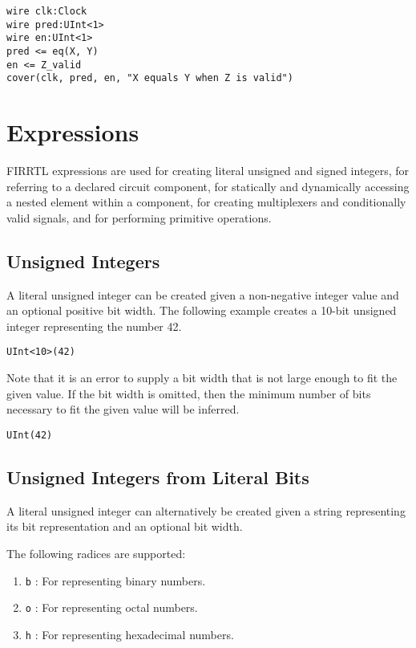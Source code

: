 \documentclass[12pt]{article}
\begin{document}
\begin{lstlisting}
wire clk:Clock
wire pred:UInt<1>
wire en:UInt<1>
pred <= eq(X, Y)
en <= Z_valid
cover(clk, pred, en, "X equals Y when Z is valid")
\end{lstlisting}

\section{Expressions}

FIRRTL expressions are used for creating literal unsigned and signed integers, for referring to a declared circuit component, for statically and dynamically accessing a nested element within a component, for creating multiplexers and conditionally valid signals, and for performing primitive operations.

\subsection{Unsigned Integers}

A literal unsigned integer can be created given a non-negative integer value and an optional positive bit width. The following example creates a 10-bit unsigned integer representing the number 42.
\begin{lstlisting}
UInt<10>(42)
\end{lstlisting}

Note that it is an error to supply a bit width that is not large enough to fit the given value. If the bit width is omitted, then the minimum number of bits necessary to fit the given value will be inferred.
\begin{lstlisting}
UInt(42)
\end{lstlisting}

\subsection{Unsigned Integers from Literal Bits}

A literal unsigned integer can alternatively be created given a string representing its bit representation and an optional bit width.

The following radices are supported:
\begin{enumerate}
\item \verb|b| : For representing binary numbers.
\item \verb|o| : For representing octal numbers.
\item \verb|h| : For representing hexadecimal numbers.
\end{enumerate}
\end{document}
